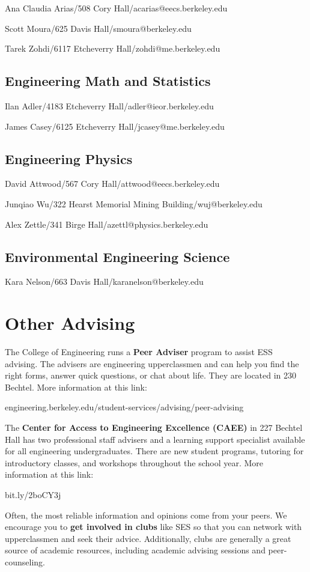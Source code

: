 Ana Claudia Arias/508 Cory Hall/{\selectfont acarias@eecs.berkeley.edu}

Scott Moura/625 Davis Hall/{\selectfont smoura@berkeley.edu}

Tarek Zohdi/6117 Etcheverry Hall/{\selectfont zohdi@me.berkeley.edu}

\subsection*{Engineering Math and Statistics}

Ilan Adler/4183 Etcheverry Hall/{\selectfont adler@ieor.berkeley.edu}

James Casey/6125 Etcheverry Hall/{\selectfont jcasey@me.berkeley.edu}

\subsection*{Engineering Physics}

David Attwood/567 Cory Hall/{\selectfont attwood@eecs.berkeley.edu}

Junqiao Wu/322 Hearst Memorial Mining Building/{\selectfont wuj@berkeley.edu}

Alex Zettle/341 Birge Hall/{\selectfont azettl@physics.berkeley.edu}

\subsection*{Environmental Engineering Science}

Kara Nelson/663 Davis Hall/{\selectfont karanelson@berkeley.edu}

\section*{Other Advising}

The College of Engineering runs a \textbf{Peer Adviser} program to assist ESS advising. The advisers are engineering upperclassmen and can help you find the right forms, answer quick questions, or chat about life. They are located in 230 Bechtel. More information at this link:

{\selectfont engineering.berkeley.edu/student-services/advising/peer-advising}

The \textbf{Center for Access to Engineering Excellence (CAEE)} in 227 Bechtel Hall has two professional staff advisers and a learning support specialist available for all engineering undergraduates. There are new student programs, tutoring for introductory classes, and workshops throughout the school year. More information at this link:

{\selectfont bit.ly/2boCY3j}

Often, the most reliable information and opinions come from your peers. We encourage you to \textbf{get involved in clubs} like SES so that you can network with upperclassmen and seek their advice. Additionally, clubs are generally a great source of academic resources, including academic advising sessions and peer-counseling.

